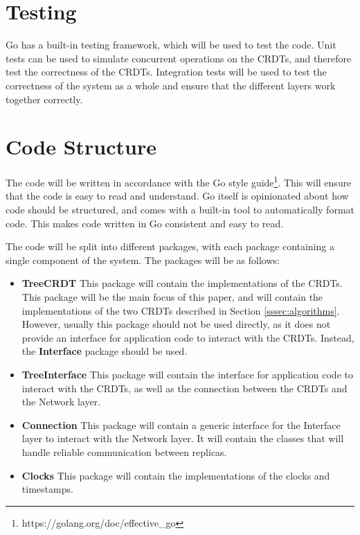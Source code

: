 \documentclass[12pt]{report}
\begin{document}
\section{Testing}
Go has a built-in testing framework, which will be used to test the code. Unit tests can be used to simulate concurrent operations on the CRDTs, and therefore test the correctness of the CRDTs. Integration tests will be used to test the correctness of the system as a whole and ensure that the different layers work together correctly. \par


\section{Code Structure}\label{sec:code_structure}
The code will be written in accordance with the Go style guide\footnote{https://golang.org/doc/effective\_go}. This will ensure that the code is easy to read and understand. Go itself is opinionated about how code should be structured, and comes with a built-in tool to automatically format code. This makes code written in Go consistent and easy to read. \par

The code will be split into different packages, with each package containing a single component of the system. The packages will be as follows:
\begin{itemize}
    \item \textbf{TreeCRDT} This package will contain the implementations of the CRDTs. This package will be the main focus of this paper, and will contain the implementations of the two CRDTs described in Section \ref{sssec:algorithms}. However, usually this package should not be used directly, as it does not provide an interface for application code to interact with the CRDTs. Instead, the \textbf{Interface} package should be used. 
    \item \textbf{TreeInterface} This package will contain the interface for application code to interact with the CRDTs, as well as the connection between the CRDTs and the Network layer.
    \item \textbf{Connection} This package will contain a generic interface for the Interface layer to interact with the Network layer. It will contain the classes that will handle reliable communication between replicas.
    \item \textbf{Clocks} This package will contain the implementations of the clocks and timestamps.
\end{itemize}
\end{document}

